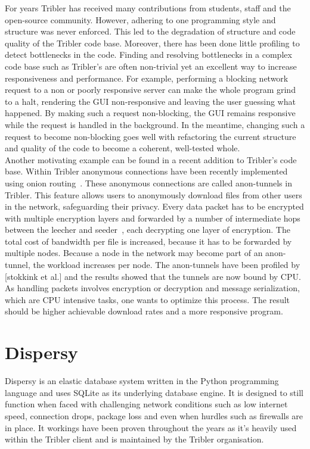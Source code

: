 For years Tribler has received many contributions from students, staff and the open-source community.
However, adhering to one programming style and structure was never enforced.
This led to the degradation of structure and code quality of the Tribler code base.
Moreover, there has been done little profiling to detect bottlenecks in the code.
Finding and resolving bottlenecks in a complex code base such as Tribler's are often non-trivial yet an excellent way to increase responsiveness and performance.
For example, performing a blocking network request to a non or poorly responsive server can make the whole program grind to a halt, rendering the GUI non-responsive and leaving the user guessing what happened.
By making such a request non-blocking, the GUI remains responsive while the request is handled in the background.
In the meantime, changing such a request to become non-blocking goes well with refactoring the current structure and quality of the code to become a coherent, well-tested whole.\\

Another motivating example can be found in a recent addition to Tribler's code base.
Within Tribler anonymous connections have been recently implemented using onion routing~\cite{Plak-anonymous,ruigrok-anonymous,tanaskoski-anonymous}.
These anonymous connections are called anon-tunnels in Tribler.
This feature allows users to anonymously download files from other users in the network, safeguarding their privacy.
Every data packet has to be encrypted with multiple encryption layers and forwarded by a number of intermediate hops between the leecher and seeder~\cite{Plak-anonymous,tanaskoski-anonymous}, each decrypting one layer of encryption.
The total cost of bandwidth per file is increased, because it has to be forwarded by multiple nodes.
Because a node in the network may become part of an anon-tunnel, the workload increases per node.
The anon-tunnels have been profiled by [stokkink et al.]  and the results showed that the tunnels are now bound by CPU.
As handling packets involves encryption or decryption and message serialization, which are CPU intensive tasks, one wants to optimize this process.
The result should be higher achievable download rates and a more responsive program.

\section{Dispersy}
Dispersy is an elastic database system written in the Python programming language and uses SQLite as its underlying database engine.
It is designed to still function when faced with challenging network conditions such as low internet speed, connection drops, package loss and even when hurdles such as firewalls are in place.
It workings have been proven throughout the years as it's heavily used within the Tribler client and is maintained by the Tribler organisation.

